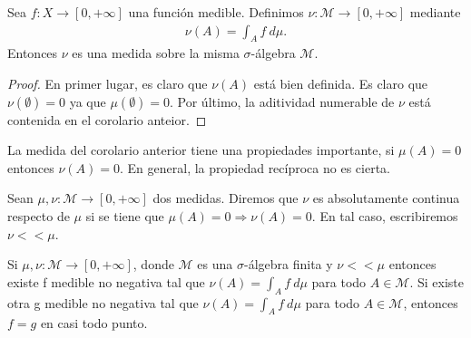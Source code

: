 \begin{cor}
Sea $f:X \longrightarrow [0,+\infty]$ una función medible. Definimos $\nu: \mathcal{M} \longrightarrow [0,+\infty]$ mediante
\begin{align*}
    \nu(A) = \int_{A}{f \ d\mu}.
\end{align*}
Entonces $\nu$ es una medida sobre la misma $\sigma$-álgebra $\mathcal{M}$.
\end{cor}

\begin{proof}
En primer lugar, es claro que $\nu(A)$ está bien definida. Es claro que $\nu(\emptyset) = 0$ ya que $\mu(\emptyset) = 0$. Por último, la aditividad numerable de $\nu$ está contenida en el corolario anteior.
\end{proof}

\begin{obs}
La medida del corolario anterior tiene una propiedades importante, si $\mu(A) = 0$ entonces $\nu(A) = 0$. En general, la propiedad recíproca no es cierta.
\end{obs}
\begin{defi}
Sean $\mu, \nu: \mathcal{M} \longrightarrow [0,+\infty]$ dos medidas. Diremos que $\nu$ es absolutamente continua respecto de $\mu$ si se tiene que $\mu(A) = 0 \Rightarrow \nu(A) = 0$. En tal caso, escribiremos $\nu << \mu$.
\end{defi}

\begin{teo}
Si $\mu, \nu: \mathcal{M} \longrightarrow [0,+\infty]$, donde $\mathcal{M}$ es una $\sigma$-álgebra finita y $\nu << \mu$ entonces existe f medible no negativa tal que $\nu(A) = \int_{A}{f \ d\mu}$ para todo $A \in \mathcal{M}$. Si existe otra g medible no negativa tal que $\nu(A) = \int_{A}{f \ d\mu}$  para todo $A \in \mathcal{M}$, entonces $f = g$ en casi todo punto.
 \end{teo}
 
